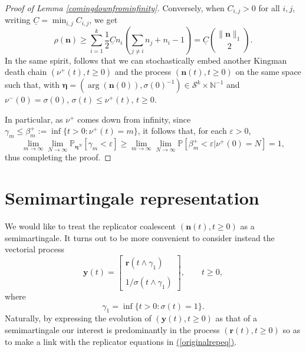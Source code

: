 \documentclass[12pt, leqno]{article}
\renewcommand{\eqref}[1]{\hyperref[#1]{(\ref*{#1})}}
\newcommand*{\norm}[1]{\lVert #1 \rVert}
\begin{document}
\begin{proof}[Proof of Lemma \ref{comingdownfrominfinity}]
Conversely, when $C_{i,j}>0$ for all $i,j$, 
writing $\underline{C} = \min_{i,j}C_{i,j}$, we get 
\[
\rho(\bm{n})
\geq
\sum_{i=1}^k\frac{1}{2}\underline{C}n_i\left(\sum_{j\neq i}n_{j} +  n_i-1\right)
= \underline{C}{\norm{\bm n}_1\choose 2}.
\]
In the same spirit,  follows that we can stochastically embed another Kingman death chain $(\nu^+(t), t\geq0)$ and the process $({\bm n}(t), t\geq 0)$ on the same space such that, with  ${\bm \eta} = (\arg({\bm n}(0)), \sigma(0)^{-1})\in \mathcal{S}^k\times \mathbb{N}^{-1}$ and $\nu^-(0) = \sigma(0)$, $\sigma(t)\leq \nu^+(t)$, $t\geq0$.

In particular, as $\nu^+$ comes down from infinity, since $
\gamma_m \leq \beta^+_{m}:=\inf\{t>0:\nu^+(t)=m\}$, it follows that, for each $\varepsilon>0$,
\[
\lim_{m\to\infty}\lim_{N\to\infty}\mathbb{P}_{{\bm \eta}^N}[\gamma_m<\varepsilon ]\geq \lim_{m\to\infty}\lim_{N\to\infty}\mathbb{P}[\beta^+_m<\varepsilon| \nu^+(0) =N]=1, %
\]
thus completing the proof.
\end{proof}




\section{Semimartingale representation}\label{smgsect}
We would like to treat the replicator coalescent $(\bm n(t), t\geq0)$ as a semimartingale. It turns out to be more convenient to consider instead the vectorial process 
\[
\bm y(t)=\begin{bmatrix}\bm r(t\wedge \gamma_1)\\\\ {1}/{\sigma(t\wedge \gamma_1)}\end{bmatrix},\qquad t\geq 0,
\]
where 
\[
\gamma_1 = \inf\{t>0: \sigma(t) = 1\}.
\]
Naturally, by expressing the evolution of $(\bm y(t), t\geq0)$ as that of a semimartingale our interest is predominantly  in the process $(\bm r(t), t\geq0)$ so as  to make a link with the replicator equations in \eqref{originalrepeq}.

\medskip
\end{document}

